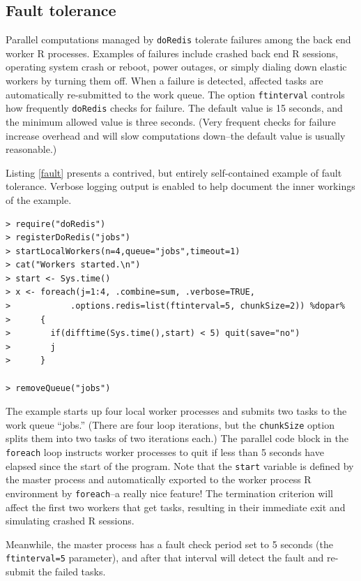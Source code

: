 \documentclass[12pt]{article}
\begin{document}
\subsection{Fault tolerance}

Parallel computations managed by {\tt doRedis} tolerate failures among the back
end worker R processes. Examples of failures include crashed back end R
sessions, operating system crash or reboot, power outages, or simply dialing
down elastic workers by turning them off. When a failure is detected, affected tasks are
automatically re-submitted to the work queue. The option {\tt ftinterval}
controls how frequently {\tt doRedis} checks for failure. The default value is
15 seconds, and the minimum allowed value is three seconds. (Very frequent checks
for failure increase overhead and will slow computations down--the default
value is usually reasonable.)

Listing \ref{fault} presents a contrived, but entirely self-contained
example of fault tolerance. Verbose logging output is enabled to help document
the inner workings of the example.
\begin{lstlisting}[float=ht,caption=Fault Tolerance Example,label=fault]
> require("doRedis")
> registerDoRedis("jobs")
> startLocalWorkers(n=4,queue="jobs",timeout=1)
> cat("Workers started.\n")
> start <- Sys.time()
> x <- foreach(j=1:4, .combine=sum, .verbose=TRUE,
>            .options.redis=list(ftinterval=5, chunkSize=2)) %dopar%
>      {
>        if(difftime(Sys.time(),start) < 5) quit(save="no")
>        j
>      }

> removeQueue("jobs")
\end{lstlisting}

The example starts up four local worker processes and submits two tasks to the
work queue ``jobs.'' (There are four loop iterations, but the \verb+chunkSize+
option splits them into two tasks of two iterations each.) The parallel code
block in the {\tt foreach} loop instructs worker processes to quit if less than
5 seconds have elapsed since the start of the program. Note that the
\verb+start+ variable is defined by the master process and automatically
exported to the worker process R environment by \verb+foreach+--a really nice
feature! The  termination criterion will affect the first two workers that get
tasks, resulting in their immediate exit and simulating crashed R sessions.

Meanwhile, the master process has a fault check period set to 5 seconds
(the {\tt ftinterval=5} parameter), and after that interval will detect
the fault and re-submit the failed tasks.
\end{document}
